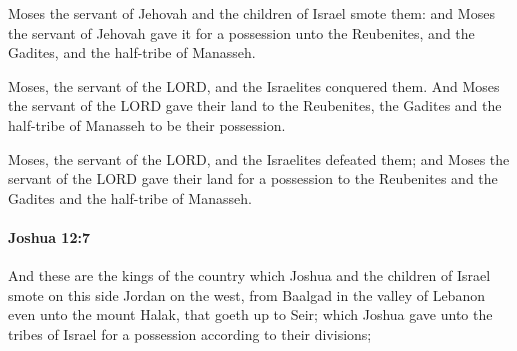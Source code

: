 			\begin{versebox}
					\item[BHS] 
					\item[ASV] Moses the servant of Jehovah and the children of Israel smote them: and Moses the servant of Jehovah gave it for a possession unto the Reubenites, and the Gadites, and the half-tribe of Manasseh.
					\item[NIV] Moses, the servant of the LORD, and the Israelites conquered them. And Moses the servant of the LORD gave their land to the Reubenites, the Gadites and the half-tribe of Manasseh to be their possession.
					\item[NRSV] Moses, the servant of the LORD, and the Israelites defeated them; and Moses the servant of the LORD gave their land for a possession to the Reubenites and the Gadites and the half-tribe of Manasseh.
			\end{versebox}

		\paragraph{Joshua 12:7} %
			\label{JOSHUA-12-7}

			And these are the kings of the country which Joshua and the children of Israel smote on this side Jordan on the west, from Baalgad in the valley of Lebanon even unto the mount Halak, that goeth up to Seir; which Joshua gave unto the tribes of Israel for a possession according to their divisions;

